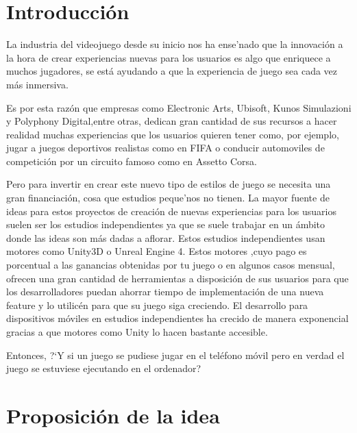 \section{Introducci\'on}
\label{cap1:sec:introduccion}

La industria del videojuego desde su inicio nos ha ense'nado que la innovaci\'on
 a la hora de crear experiencias nuevas para los usuarios es algo que enriquece a muchos jugadores, se est\'a ayudando a que
la experiencia de juego sea cada vez m\'as inmersiva.

Es por esta raz\'on que empresas como Electronic Arts, Ubisoft, Kunos Simulazioni y Polyphony Digital,entre otras, dedican gran cantidad de sus recursos
a hacer realidad muchas experiencias que los usuarios quieren tener como, por ejemplo,
 jugar a juegos deportivos realistas como en FIFA o conducir automoviles de competici\'on por un circuito famoso como en Assetto Corsa.

Pero para invertir en crear este nuevo tipo de estilos de juego se necesita una gran financiaci\'on,
 cosa que estudios peque'nos no tienen. La mayor fuente de ideas para estos proyectos de creaci\'on
 de nuevas experiencias para los usuarios suelen ser los estudios independientes ya que se suele trabajar en un
 \'ambito donde las ideas son m\'as dadas a aflorar. Estos estudios independientes usan motores como Unity3D o Unreal Engine 4.
 Estos motores ,cuyo pago es porcentual a las ganancias obtenidas por tu juego o en algunos casos mensual, ofrecen una gran cantidad de herramientas a disposici\'on 
de sus usuarios para que los desarrolladores puedan ahorrar tiempo de implementaci\'on de una nueva feature y lo utilic\'en para que su juego siga creciendo.
El desarrollo para dispositivos m\'oviles en estudios independientes ha crecido de manera exponencial gracias a que motores como Unity lo hacen bastante accesible. 


Entonces,
 ?`Y si un juego se pudiese jugar en el tel\'efono m\'ovil pero en verdad el juego se estuviese ejecutando en el ordenador?


\section{Proposici\'on de la idea}
\label{cap1:sec:porp-idea}

